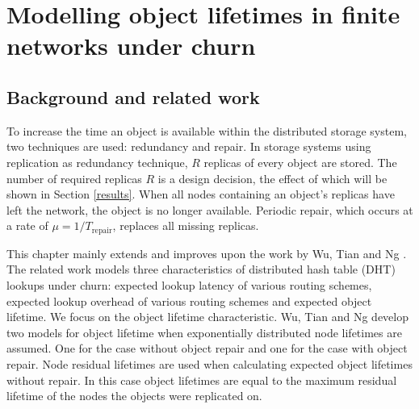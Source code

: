 \chapter{Modelling object lifetimes in finite networks under churn}
\label{chp:MODELLING}


\section{Background and related work}
\label{related_work}

To increase the time an object is available within the distributed storage system, two techniques are used: redundancy and repair. In storage systems using replication as redundancy technique, $R$ replicas of every object are stored. The number of required replicas $R$ is a design decision, the effect of which will be shown in Section \ref{results}. When all nodes containing an object's replicas have left the network, the object is no longer available. Periodic repair, which occurs at a rate of $\mu = 1/T_{\textrm{repair}}$, replaces all missing replicas.

This chapter mainly extends and improves upon the work by Wu, Tian and Ng \cite{replication_article}. The related work models three characteristics of distributed hash table (DHT) lookups under churn: expected lookup latency of various routing schemes, expected lookup overhead of various routing schemes and expected object lifetime. We focus on the object lifetime characteristic. Wu, Tian and Ng develop two models for object lifetime when exponentially distributed node lifetimes are assumed. One for the case without object repair and one for the case with object repair. Node residual lifetimes are used when calculating expected object lifetimes without repair. In this case object lifetimes are equal to the maximum residual lifetime of the nodes the objects were replicated on.


